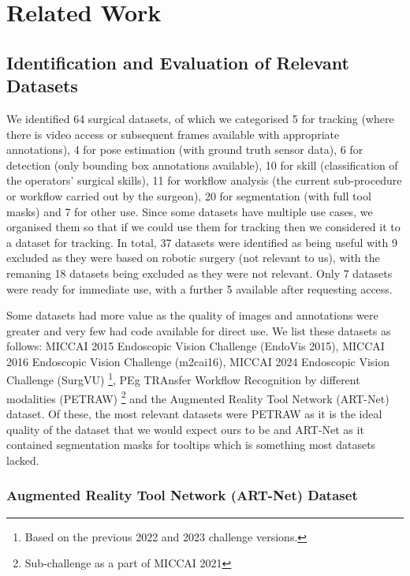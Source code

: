 \section{Related Work}

\subsection{Identification and Evaluation of Relevant Datasets}


We identified 64 surgical datasets, of which we categorised 5 for tracking (where there is video access or subsequent frames available with appropriate annotations), 4 for pose estimation (with ground truth sensor data), 6 for detection (only bounding box annotations available), 10 for skill (classification of the operators' surgical skills), 11 for workflow analysis (the current sub-procedure or workflow carried out by the surgeon), 20 for segmentation (with full tool masks) and 7 for other use. Since some datasets have multiple use cases, we organised them so that if we could use them for tracking then we considered it to a dataset for tracking. In total, 37 datasets were identified as being useful with 9 excluded as they were based on robotic surgery (not relevant to us), with the remaning 18 datasets being excluded as they were not relevant. Only 7 datasets were ready for immediate use, with a further 5 available after requesting access.

Some datasets had more value as the quality of images and annotations were greater and very few had code available for direct use. We list these datasets as follows: MICCAI 2015 Endoscopic Vision Challenge (EndoVis 2015), MICCAI 2016 Endoscopic Vision Challenge (m2cai16), MICCAI 2024 Endoscopic Vision Challenge (SurgVU) \footnote{Based on the previous 2022 and 2023 challenge versions.}, PEg TRAnsfer Workflow Recognition by different modalities (PETRAW) \footnote{Sub-challenge as a part of MICCAI 2021} and the Augmented Reality Tool Network (ART-Net) dataset. Of these, the most relevant datasets were PETRAW as it is the ideal quality of the dataset that we would expect ours to be and ART-Net as it contained segmentation masks for tooltips which is something most datasets lacked.


\subsubsection{Augmented Reality Tool Network (ART-Net) Dataset}


